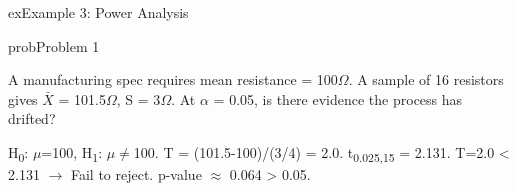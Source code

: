 \begin{PSbox}[unbreakable]{ex}{Example 3: Power Analysis}
\begin{Shaded}
\begin{Highlighting}[]
\OperatorTok{;}
\NormalTok{(}\OperatorTok{,} \OperatorTok{,} \OperatorTok{,} \OperatorTok{,} \NormalTok{)}\OperatorTok{;}
\NormalTok{(}\NormalTok{)}\OperatorTok{;} \NormalTok{(}\NormalTok{)}\OperatorTok{;}
\NormalTok{(}\NormalTok{(}\OperatorTok{,} \OperatorTok{*}\NormalTok{))}\OperatorTok{;}
 \OperatorTok{;}
\NormalTok{(}\OperatorTok{,} \OperatorTok{,} \NormalTok{)}\OperatorTok{;}
\NormalTok{(}\OperatorTok{,} \NormalTok{(}\NormalTok{(} \OperatorTok{\textgreater{}=} \OperatorTok{,} \NormalTok{)))}\OperatorTok{;}
\end{Highlighting}
\end{Shaded}

\end{PSbox}


\begin{PSbox}[unbreakable]{prob}{Problem 1}

A manufacturing spec requires mean resistance = 100\ensuremath{\Omega}. A sample of 16 resistors gives \ensuremath{\bar{X}} = 101.5\ensuremath{\Omega}, S = 3\ensuremath{\Omega}. At \ensuremath{\alpha} = 0.05, is there evidence the process has drifted?

\PSsolution{} H\textsubscript{0}: \ensuremath{\mu}=100, H\textsubscript{1}: \ensuremath{\mu}\ensuremath{\neq}100. T = (101.5-100)/(3/4) = 2.0. t\textsubscript{0.025,15} = 2.131. \textbar{}T\textbar{}=2.0 \textless{} 2.131 \ensuremath{\to} Fail to reject. p-value \ensuremath{\approx} 0.064 \textgreater{} 0.05.

\end{PSbox}

